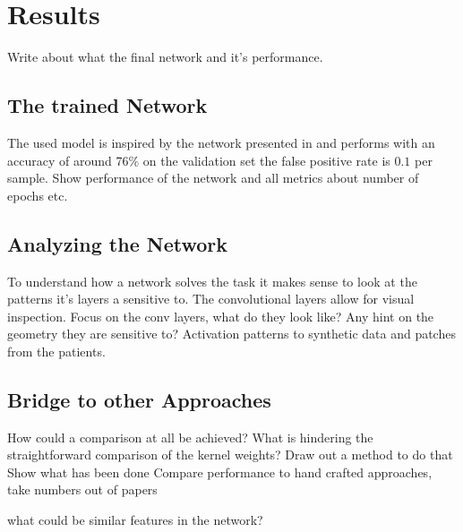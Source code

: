 \documentclass[main.tex]{subfiles}
\begin{document}
\chapter{Results}\label{chap:results}
Write about what the final network and it's performance.

\section{The trained Network}
The used model is inspired by the network presented in \cite{huang2017lung} and performs with an accuracy of around 76$\%$ on the validation set the false positive rate is $0.1$ per sample.
Show performance of the network and all metrics about number of epochs etc.


\section{Analyzing the Network}
To understand how a network solves the task it makes sense to look at the patterns it's layers a sensitive to. The convolutional layers allow for visual inspection.
Focus on the conv layers, what do they look like? Any hint on the geometry they are sensitive to?
Activation patterns to synthetic data and patches from the patients.

\section{Bridge to other Approaches}
How could a comparison at all be achieved? What is hindering the straightforward comparison of the kernel weights? Draw out a method to do that
Show what has been done
Compare performance to hand crafted approaches, 
take numbers out of papers

what could be similar features in the network?
\end{document}
